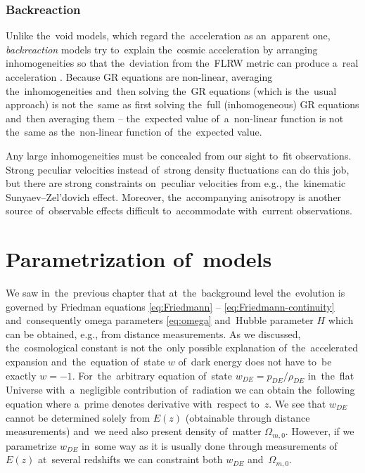 \subsubsection{Backreaction}
Unlike the~void models, which regard the~acceleration as an~apparent one, \textit{backreaction} models try to~explain the~cosmic acceleration by arranging inhomogeneities so that the~deviation from the~FLRW metric can produce a~real acceleration \parencite{2011CQGra..28w5002S,2004JCAP...02..003R,2005PhRvD..72b3507M}. Because GR equations are non-linear, averaging the~inhomogeneities and~then solving the~GR equations (which is the~usual approach) is not the~same as first solving the~full (inhomogeneous) GR equations and~then averaging them -- the~expected value of~a~non-linear function is not the~same as the~non-linear function of~the~expected value.

Any large inhomogeneities must be concealed from our sight to~fit observations. Strong peculiar velocities instead of~strong density fluctuations can do this job, but there are strong constraints on~peculiar velocities from e.g., the~kinematic Sunyaev--Zel'dovich effect. Moreover, the~accompanying anisotropy is another source of~observable effects difficult to~accommodate with~current observations.

\section{Parametrization of~models}
We saw in~the~previous chapter that at~the~background level the~evolution is governed by Friedman equations \eqref{eq:Friedmann} -- \eqref{eq:Friedmann-continuity} and~consequently omega parameters \eqref{eq:omega} and~Hubble parameter $H$ which can be obtained, e.g., from distance measurements. As we discussed, the~cosmological constant is not the~only possible explanation of~the~accelerated expansion and~the~equation of~state \(w\) of~dark energy does not have to~be exactly \(w=-1\). For~the~arbitrary equation of~state $w_{DE}=p_{DE}/\rho_{DE}$ in~the~flat Universe with~a~negligible contribution of~radiation we can obtain the~following equation
where a~prime denotes derivative with~respect to~\(z\). We see that \(w_{DE}\) cannot be determined solely from \(E(z)\) (obtainable through distance measurements) and~we need also present density of~matter \(\Omega_{m,0}\). However, if we parametrize \(w_{DE}\) in~some way as it is usually done through measurements of~\(E(z)\) at~several redshifts we can constraint both \(w_{DE}\) and~\(\Omega_{m,0}\).

